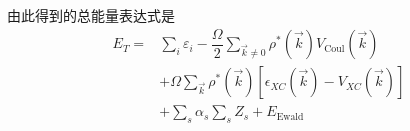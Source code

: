 由此得到的总能量表达式是
\begin{equation}
	\begin{aligned}
		E_T=&\sum_i\varepsilon_i-\dfrac{\Omega}2\sum_{\vec k\neq0}\rho^{\ast}(\vec k)V_{\mathrm{Coul}}(\vec k)\\
		&+\Omega\sum_{\vec k}\rho^{\ast}(\vec k)[\epsilon_{XC}(\vec k)-V_{XC}(\vec k)]\\
		&+\sum_s\alpha_s\sum_sZ_s+E_{\mathrm{Ewald}}
	\end{aligned}
\end{equation}

